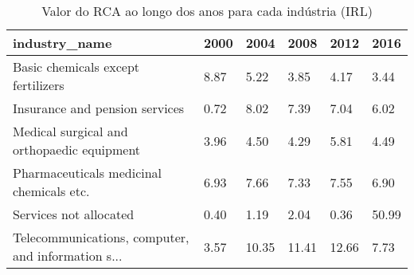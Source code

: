 \begin{table}
\centering
\caption{Valor do RCA ao longo dos anos para cada indústria (IRL)}
\begin{tabular}{p{6cm}p{1.5cm}p{1.5cm}p{1.5cm}p{1.5cm}p{1.5cm}}
\toprule
                                     industry\_name & 2000 &  2004 &  2008 &  2012 &  2016 \\
\midrule
                Basic chemicals except fertilizers & 8.87 &  5.22 &  3.85 &  4.17 &  3.44 \\
                    Insurance and pension services & 0.72 &  8.02 &  7.39 &  7.04 &  6.02 \\
        Medical surgical and orthopaedic equipment & 3.96 &  4.50 &  4.29 &  5.81 &  4.49 \\
          Pharmaceuticals medicinal chemicals etc. & 6.93 &  7.66 &  7.33 &  7.55 &  6.90 \\
                            Services not allocated & 0.40 &  1.19 &  2.04 &  0.36 & 50.99 \\
Telecommunications, computer, and information s... & 3.57 & 10.35 & 11.41 & 12.66 &  7.73 \\
\bottomrule
\end{tabular}
\end{table}
